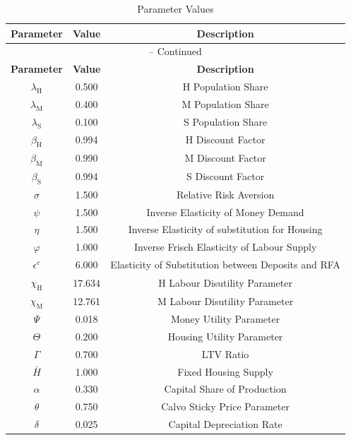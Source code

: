 \begin{center}
\begin{longtable}{ccc}
\caption{Parameter Values}\\%
\toprule%
\multicolumn{1}{c}{\textbf{Parameter}} &
\multicolumn{1}{c}{\textbf{Value}} &
 \multicolumn{1}{c}{\textbf{Description}}\\%
\midrule%
\endfirsthead
\multicolumn{3}{c}{{\tablename} \thetable{} -- Continued}\\%
\midrule%
\multicolumn{1}{c}{\textbf{Parameter}} &
\multicolumn{1}{c}{\textbf{Value}} &
  \multicolumn{1}{c}{\textbf{Description}}\\%
\midrule%
\endhead
$\lambda_\mathrm{H}$ 	 & 	 0.500 	 & 	 H Population Share\\
$\lambda_\mathrm{M}$ 	 & 	 0.400 	 & 	 M Population Share\\
$\lambda_\mathrm{S}$ 	 & 	 0.100 	 & 	 S Population Share\\
$\beta_\mathrm{H}$ 	 & 	 0.994 	 & 	 H Discount Factor\\
$\beta_\mathrm{M}$ 	 & 	 0.990 	 & 	 M Discount Factor\\
$\beta_\mathrm{S}$ 	 & 	 0.994 	 & 	 S Discount Factor\\
$\sigma$ 	 & 	 1.500 	 & 	 Relative Risk Aversion\\
$\psi$ 	 & 	 1.500 	 & 	 Inverse Elasticity of Money Demand\\
$\eta$ 	 & 	 1.500 	 & 	 Inverse Elasticity of substitution for Housing\\
$\varphi$ 	 & 	 1.000 	 & 	 Inverse Frisch Elasticity of Labour Supply\\
$\epsilon^c$ 	 & 	 6.000 	 & 	 Elasticity of Substitution between Deposits and RFA\\
$\chi_\mathrm{H}$ 	 & 	 17.634 	 & 	 H Labour Disutility Parameter\\
$\chi_\mathrm{M}$ 	 & 	 12.761 	 & 	 M Labour Disutility Parameter\\
$\Psi$ 	 & 	 0.018 	 & 	 Money Utility Parameter\\
$\Theta$ 	 & 	 0.200 	 & 	 Housing Utility Parameter\\
$\Gamma$ 	 & 	 0.700 	 & 	 LTV Ratio\\
$\bar{H}$ 	 & 	 1.000 	 & 	 Fixed Housing Supply\\
$\alpha$ 	 & 	 0.330 	 & 	 Capital Share of Production\\
$\theta$ 	 & 	 0.750 	 & 	 Calvo Sticky Price Parameter\\
$\delta$ 	 & 	 0.025 	 & 	 Capital Depreciation Rate\\

\end{longtable}
\end{center}

